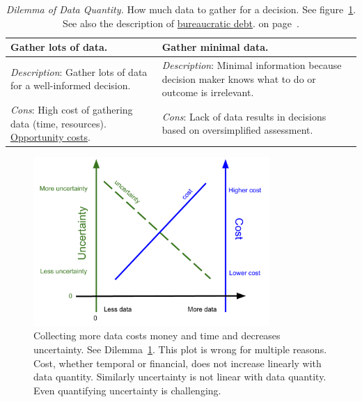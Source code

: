 

\begin{center}
\begin{table}[H] %
\begin{tabular}{ | m{\dilemmatablewidth}| m{\dilemmatablewidth} | } 
  \hline
  \textbf{Gather lots of data.} &
  \textbf{Gather minimal data.} \\
  \hline
  \textit{Description}: Gather lots of data for a well-informed decision. &
  \textit{Description}: Minimal information because decision maker knows what to do or outcome is irrelevant.  \\  
  \hline
  \textit{Cons}: High cost of gathering data (time, resources). \href{https://en.wikipedia.org/wiki/Opportunity_cost}{Opportunity costs}.
  \index{Wikipedia!\href{https://en.wikipedia.org/wiki/Opportunity_cost}{Opportunity cost}}
  & 
  \textit{Cons}: Lack of data results in decisions based on oversimplified assessment. \\
  \hline
\end{tabular}
\caption{
\textit{Dilemma of Data Quantity.}
How much data to gather for a decision. See figure~\ref{fig:data_collection_cost_uncertainty}. See also the description of 
 \hyperref[sec:bureaucratic-debt]{bureaucratic debt}.
on page~\pageref{sec:bureaucratic-debt}.
}
\label{table:gather-data-lots-vs-little}
\end{table}
\end{center}

\begin{figure}[H] %
        \centering
        \includegraphics[width=0.8\textwidth]{images/cost_and_uncertainty_for_data_collection}
        \caption{Collecting more data costs money and time and decreases uncertainty.  See Dilemma~\ref{table:gather-data-lots-vs-little}. This plot is wrong for multiple reasons. Cost, whether temporal or financial, does not increase linearly with data quantity. Similarly uncertainty is not linear with data quantity. Even quantifying uncertainty is challenging. }
        \label{fig:data_collection_cost_uncertainty}
\end{figure}



